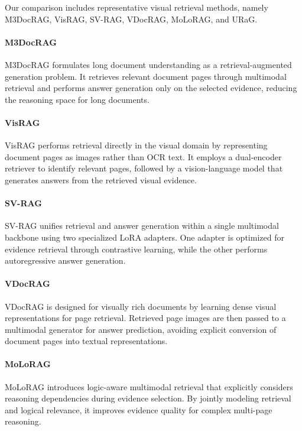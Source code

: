 \documentclass[letterpaper]{article} %
\begin{document}
Our comparison includes representative visual retrieval methods, namely M3DocRAG, VisRAG, SV-RAG, VDocRAG, MoLoRAG, and URaG.

\paragraph{M3DocRAG}

M3DocRAG formulates long document understanding as a retrieval-augmented generation problem. It retrieves relevant document pages through multimodal retrieval and performs answer generation only on the selected evidence, reducing the reasoning space for long documents.

\paragraph{VisRAG}

VisRAG performs retrieval directly in the visual domain by representing document pages as images rather than OCR text. It employs a dual-encoder retriever to identify relevant pages, followed by a vision-language model that generates answers from the retrieved visual evidence.

\paragraph{SV-RAG}

SV-RAG unifies retrieval and answer generation within a single multimodal backbone using two specialized LoRA adapters. One adapter is optimized for evidence retrieval through contrastive learning, while the other performs autoregressive answer generation.

\paragraph{VDocRAG}

VDocRAG is designed for visually rich documents by learning dense visual representations for page retrieval. Retrieved page images are then passed to a multimodal generator for answer prediction, avoiding explicit conversion of document pages into textual representations.

\paragraph{MoLoRAG}

MoLoRAG introduces logic-aware multimodal retrieval that explicitly considers reasoning dependencies during evidence selection. By jointly modeling retrieval and logical relevance, it improves evidence quality for complex multi-page reasoning.
\end{document}
